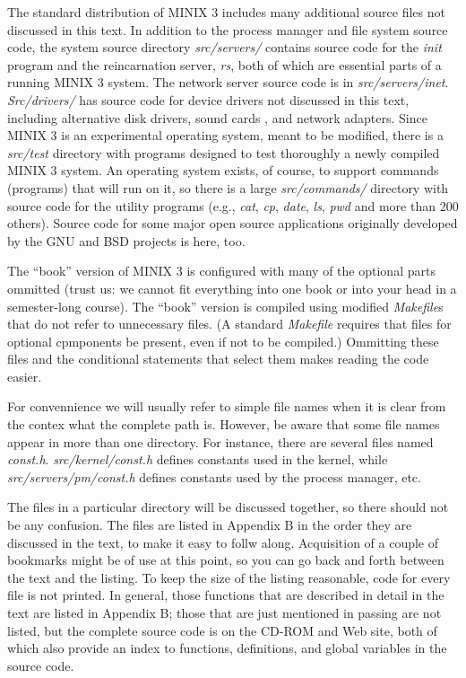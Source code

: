 \documentclass{book}
\newcommand {\sys} [1] {\textsl{#1}}
\begin{document}
The standard distribution of MINIX 3 includes many additional source files not discussed in this text.
In addition to the process manager and file system source code,
the system source directory \sys{src/servers/} contains source code for the \sys{init} program and the reincarnation server, 
\sys{rs}, both of which are essential parts of a running MINIX 3 system.
The network server source code is in \sys{src/servers/inet}.
\sys{Src/drivers/} has source code for device drivers not discussed in this text,
including alternative disk drivers, sound cards , and network adapters.
Since MINIX 3 is an experimental operating system, meant to be modified, 
there is a \sys{src/test} directory with programs designed to test thoroughly a newly compiled MINIX 3 system.
An operating system exists, of course, to support commands (programs) that will run on it,
so there is a large \sys{src/commands/} directory with source code for the utility programs 
(e.g., \sys{cat}, \sys{cp}, \sys{date}, \sys{ls}, \sys{pwd} and more than 200 others).
Source code for some major open source applications originally developed by the GNU and BSD projects is here, too.

The ``book'' version of MINIX 3 is configured with many of the optional parts ommitted 
(trust us: we cannot fit everything into one book or into your head in a semester-long course).
The ``book'' version is compiled using modified \sys{Makefile}s that do not refer to unnecessary files.
(A standard \sys{Makefile} requires that files for optional cpmponents be present, even if not to be compiled.)
Ommitting these files and the conditional statements that select them makes reading the code easier.

For convennience we will usually refer to simple file names when it is clear from the contex what the complete path is.
However, be aware that some file names appear in more than one directory.
For instance, there are several files named \sys{const.h}.
\sys{src/kernel/const.h} defines constants used in the kernel, 
while \sys{src/servers/pm/const.h} defines constants used by the process manager, etc.

The files in a particular directory will be discussed together,
so there should not be any confusion.
The files are listed in Appendix B in the order they are discussed in the text, to make it easy to follw along.
Acquisition of a couple of bookmarks might be of use at this point,
so you can go back and forth between the text and the listing.
To keep the size of the listing reasonable, code for every file is not printed.
In general, those functions that are described in detail in the text are listed in Appendix B;
those that are just mentioned in passing are not listed, but the complete source code is on the CD-ROM and Web site,
both of which also provide an index to functions, definitions, and global variables in the source code.
\end{document}
